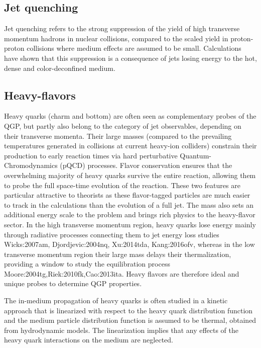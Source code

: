 \subsection{Jet quenching}
Jet quenching refers to the strong suppression of the yield of high transverse momentum hadrons in nuclear collisions, compared to the scaled yield in proton-proton collisions where medium effects are assumed to be small.
Calculations have shown that this suppression is a consequence of jets losing energy to the hot, dense and color-deconfined medium. 

\subsection{Heavy-flavors}
Heavy quarks (charm and bottom) are often seen as complementary probes of the QGP, but partly also belong to the category of jet observables, depending on their transverse momenta. Their large masses (compared to the prevailing temperatures generated in collisions at current heavy-ion colliders) constrain their production to early reaction times via hard perturbative Quantum-Chromodynamics (pQCD) processes. Flavor conservation ensures that the overwhelming majority of heavy quarks survive the entire reaction, allowing them to probe the full space-time evolution of the reaction.
These two features are particular attractive to theorists as these flavor-tagged particles are much easier to track in the calculations than the evolution of a full jet.
The mass also sets an additional energy scale to the problem and brings rich physics to the heavy-flavor sector.
In the high transverse momentum region, heavy quarks lose energy mainly through radiative processes connecting them to jet energy loss studies {Wicks:2007am, Djordjevic:2004nq, Xu:2014tda, Kang:2016ofv}, whereas
in the low transverse momentum region their large mass delays their thermalization, providing a window to study the equilibration process {Moore:2004tg,Riek:2010fk,Cao:2013ita}.
Heavy flavors are therefore ideal and unique probes to determine QGP properties.

The in-medium propagation of heavy quarks is often studied in a kinetic approach that is linearized with respect to the heavy quark distribution function and the medium particle distribution function is assumed to be thermal, obtained from hydrodynamic models.
The linearization implies that any effects of the heavy quark interactions on the medium are neglected.

